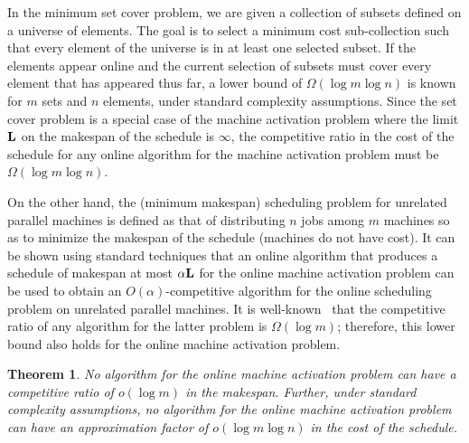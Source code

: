 \documentclass[11pt]{article}
\newtheorem{theorem}{Theorem}
\begin{document}
In the minimum set cover problem, we are given a collection of subsets defined on 
a universe of elements. The goal is to select a minimum cost sub-collection
such that every element of the universe is in at least
one selected subset. If the elements appear online
and the current selection of subsets must cover every element that has
appeared thus far, a lower bound of $\Omega(\log m\log n)$ is 
known~\cite{Korman05}
for $m$ sets and $n$ elements, under standard complexity assumptions. 
Since the set cover problem is a special case of the machine activation problem
where the limit $\bf L$ on the makespan of the schedule is $\infty$, 
the competitive ratio in the cost of the schedule for any online algorithm 
for the machine activation problem must be $\Omega(\log m \log n)$.

On the other hand, the (minimum makespan) scheduling problem 
for unrelated parallel machines is 
defined as that of distributing $n$ jobs among $m$ machines so as to minimize the 
makespan of the schedule (machines do not have cost). It can be shown using standard 
techniques that an online algorithm that produces a schedule of makespan at most 
$\alpha{\bf L}$ for the online machine activation 
problem can be used to obtain an $O(\alpha)$-competitive algorithm for the online
scheduling problem on unrelated parallel machines. 
It is well-known~\cite{AzarNR95} that the competitive ratio of any algorithm 
for the latter problem is $\Omega(\log m)$; therefore, this
lower bound also holds for the online machine activation problem. 
\begin{theorem}
\label{thm:lowerbound}
No algorithm for the online machine activation problem can have a competitive
ratio of $o(\log m)$ in the makespan. Further, under standard complexity 
assumptions, no algorithm for the online machine activation problem can have 
an approximation factor of $o(\log m \log n)$ in the cost of the schedule.
\end{theorem}
\noindent
\end{document}
